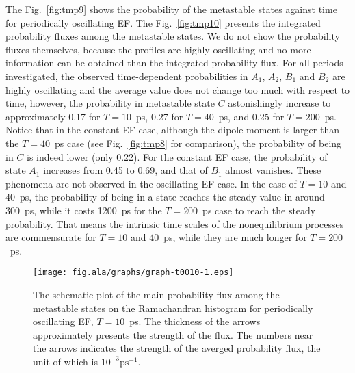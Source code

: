 \documentclass[a4paper,preprint,unsortedaddress,onecolumn]{revtex4-1}
\begin{document}
The Fig.~\ref{fig:tmp9} shows the probability of the
metastable states against time for periodically oscillating EF.  The
Fig.~\ref{fig:tmp10} presents the integrated probability fluxes among
the metastable states. We do not show the probability fluxes themselves,
because the profiles are highly oscillating and no more
information can be obtained than the integrated probability flux.
For all periods investigated,
the observed time-dependent probabilities  in $A_1$, $A_2$, $B_1$ and $B_2$ are
highly oscillating and the average value does not change
too much with respect to time,
however, the probability in metastable state $C$ astonishingly
increase to approximately 0.17 for $T=10$~ps, 0.27 for  $T=40$~ps, and
0.25 for $T=200$~ps.
Notice that in the constant EF case, although the dipole moment is
larger than the  $T=40$~ps case (see Fig.~\ref{fig:tmp8} for comparison), the
probability of being in $C$ is indeed lower (only 0.22).
For the constant EF case, the probability of state $A_1$
increases from 0.45 to 0.69, and that of $B_1$ almost vanishes.
These phenomena are not observed in the oscillating EF case.
In the case of $T=10$ and $40$~ps, the probability of being in a state
reaches the steady value in around 300~ps, while it costs 1200~ps
for the $T=200$~ps case to reach the steady probability. That means
the intrinsic time scales of the nonequilibrium processes are commensurate
for $T=10$ and $40$~ps, while they are much longer for $T=200$~ps.

\begin{figure}
  \centering
  \texttt{[image: fig.ala/graphs/graph-t0010-1.eps]}
  \caption{The schematic plot of the main probability flux among the metastable
    states on the Ramachandran histogram
    for periodically oscillating EF, $T=10$~ps. The thickness 
    of the arrows approximately presents the strength of the flux.
    The numbers near the arrows indicates the strength of the averged
    probability flux, the unit of which is $10^{-3}\textrm{ps}^{-1}$.
  }
  \label{fig:tmp11}
\end{figure}
\end{document}
